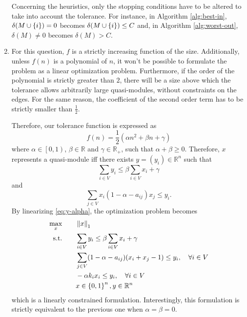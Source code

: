\documentclass[a4paper, 12pt]{article}
\begin{document}
\begin{enumerate}[leftmargin=*]
        Concerning the heuristics, only the stopping conditions have to be altered to take into account the tolerance. For instance, in Algorithm \ref{alg:best-in}, $\delta(M \cup \left\{i\right\}) = 0$ becomes $\delta(M \cup \left\{i\right\}) \leq C$ and, in Algorithm \ref{alg:worst-out}, $\delta(M) \neq 0$ becomes $\delta(M) > C$.
        
        \item For this question, $f$ is a strictly increasing function of the size. Additionally, unless $f(n)$ is a polynomial of $n$, it won't be possible to formulate the problem as a linear optimization problem. Furthermore, if the order of the polynomial is strictly greater than $2$, there will be a size above which the tolerance allows arbitrarily large quasi-modules, without constraints on the edges. For the same reason, the coefficient of the second order term has to be strictly smaller than $\frac{1}{2}$.

        Therefore, our tolerance function is expressed as
        \begin{equation}
            f(n) = \frac{1}{2} (\alpha n^2 + \beta n + \gamma)
        \end{equation}
        where $\alpha \in \left[0, 1\right)$, $\beta \in \mathbb{R}$ and $\gamma \in \mathbb{R}_+$, such that $\alpha + \beta \geq 0$. Therefore, $x$ represents a quasi-module iff there exists $y = (y_i) \in \mathbb{R}^n$ such that
        \begin{equation}
            \sum_{i \in V} y_i \leq \beta \sum_{i \in V} x_i + \gamma
        \end{equation}
        and
        \begin{equation} \label{eq:y-alpha}
            \sum_{j \in V} x_i (1 - \alpha - a_{ij}) x_j \leq y_i .
        \end{equation}
        By linearizing \eqref{eq:y-alpha}, the optimization problem becomes
        \begin{alignat*}{3}
            \max_{x} && \quad & \left\|x\right\|_1 \\
            \text{s.t.} &&& \sum_{i \in V} y_i \leq \beta \sum_{i \in V} x_i + \gamma \\
            &&& \sum_{j \in V} (1 - \alpha - a_{ij}) (x_i + x_j - 1) \leq y_i, \quad \forall i \in V \\
            &&& - \alpha k_i x_i \leq y_i, \quad \forall i \in V \\
            &&& x \in \left\{0, 1\right\}^n, y \in \mathbb{R}^n
        \end{alignat*}
        which is a linearly constrained formulation. Interestingly, this formulation is strictly equivalent to the previous one when $\alpha = \beta = 0$.
        

\end{enumerate}
\end{document}
